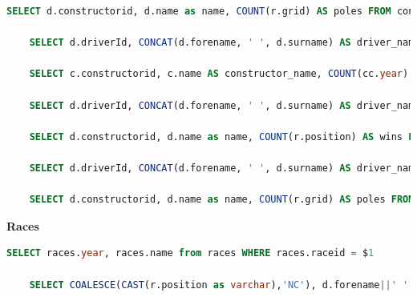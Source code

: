 \documentclass{article}
\begin{document}
\begin{enumerate}
\begin{lstlisting}[language=SQL]
    SELECT d.constructorid, d.name as name, COUNT(r.grid) AS poles FROM constructors d JOIN results r ON d.constructorId = r.constructorId WHERE r.grid = 1 GROUP BY d.constructorId, name HAVING COUNT(r.grid) >= 1 ORDER BY poles DESC LIMIT 5;

    SELECT d.driverId, CONCAT(d.forename, ' ', d.surname) AS driver_name, COUNT(c.year) as championship_count FROM champions c JOIN drivers d ON c.driverId = d.driverId GROUP BY d.driverId, driver_name ORDER BY championship_count DESC;

    SELECT c.constructorid, c.name AS constructor_name, COUNT(cc.year) AS championship_count FROM constructor_champions cc JOIN constructors c ON cc.constructorid = c.constructorid GROUP BY c.name,c.constructorid ORDER BY championship_count DESC;

    SELECT d.driverId, CONCAT(d.forename, ' ', d.surname) AS driver_name, COUNT(r.position) AS wins FROM drivers d JOIN results r ON d.driverId = r.driverId WHERE r.position = 1 GROUP BY d.driverId, driver_name HAVING COUNT(r.position) >= 1 ORDER BY wins DESC;

    SELECT d.constructorid, d.name as name, COUNT(r.position) AS wins FROM constructors d JOIN results r ON d.constructorId = r.constructorId WHERE r.position = 1 GROUP BY d.constructorId, name HAVING COUNT(r.position) >= 1 ORDER BY wins DESC;

    SELECT d.driverId, CONCAT(d.forename, ' ', d.surname) AS driver_name, COUNT(r.grid) AS pole_positions_count FROM drivers d JOIN results r ON d.driverId = r.driverId WHERE r.grid = 1 GROUP BY d.driverId HAVING COUNT(r.grid) >= 1 ORDER BY pole_positions_count DESC;

    SELECT d.constructorid, d.name as name, COUNT(r.grid) AS poles FROM constructors d JOIN results r ON d.constructorId = r.constructorId WHERE r.grid = 1 GROUP BY d.constructorId, name HAVING COUNT(r.grid) >= 1 ORDER BY poles DESC;
\end{lstlisting}\vspace{6mm}

\textbf{Races}\\

\begin{lstlisting}[language=SQL]
    SELECT races.year, races.name from races WHERE races.raceid = $1

    SELECT COALESCE(CAST(r.position as varchar),'NC'), d.forename||' '||d.surname, d.driverid, c.name AS constructor_name, c.constructorid, r.points FROM results r JOIN races ra ON r.raceId = ra.raceId JOIN drivers d ON r.driverId = d.driverId JOIN constructors c ON r.constructorId = c.constructorId WHERE ra.raceid = $1 ORDER BY r.position ASC;


\end{lstlisting}
\end{enumerate}
\end{document}
